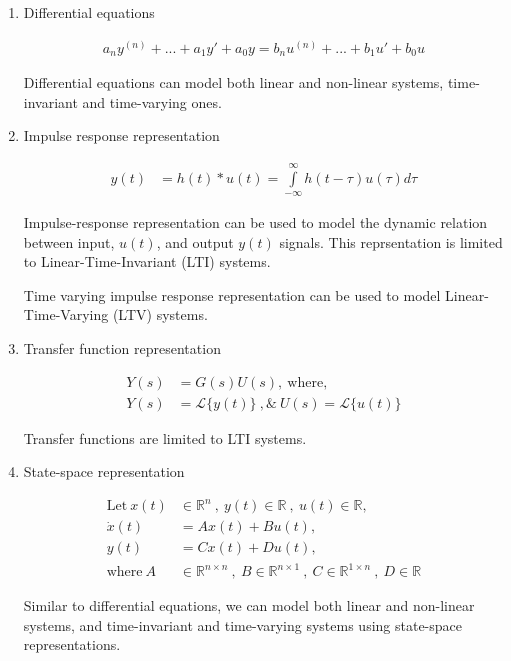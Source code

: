 \documentclass[twoside]{article}
\begin{document}
\begin{enumerate}
  \item Differential equations

\begin{align*}
a_n  y^{(n)} + ... + a_1 y' + a_0 y = b_{n}  u^{(n)} + ... + b_1 u' + b_0 u 
\end{align*}

Differential equations can model both linear and non-linear systems,
time-invariant and time-varying ones. 

  \item Impulse response representation

\begin{align*}
  y(t) &= h(t) \ast u(t) = \int\limits_{-\infty}^{\infty} h(t-\tau) u(\tau) d\tau 
\end{align*}

Impulse-response representation can be used to model the dynamic
relation between input, $u(t)$, and output $y(t)$ signals. 
This reprsentation is limited to Linear-Time-Invariant (LTI) systems. 

\par

Time varying impulse response representation can be used to model 
Linear-Time-Varying (LTV) systems.

\item Transfer function representation 

\begin{align*}
  Y(s) &= G(s) U(s) , \ \mathrm{where}  , \\
  Y(s) &= \mathcal{L}\lbrace y(t) \rbrace \ , \& \   
  U(s) = \mathcal{L}\lbrace u(t) \rbrace
\end{align*}

Transfer functions are limited to LTI systems. 

\item State-space representation

\begin{align*}
  \mathrm{Let} \ x(t) &\in \mathbb{R}^n \ , \ y(t) \in \mathbb{R} \ ,\  u(t) \in
  \mathbb{R} , \\
  \dot{x}(t) &= A x(t) + B u(t) , \\
  y(t) &= C x(t) + D u(t) , \\
  \mathrm{where} \ A &\in \mathbb{R}^{n \times n} \ , \ 
    B \in \mathbb{R}^{n \times 1} \ ,\  C \in \mathbb{R}^{1 \times n} \ , \ D \in \mathbb{R}
\end{align*}

Similar to differential equations, we can model both linear and non-linear systems,
and time-invariant and time-varying systems using state-space representations.

\end{enumerate}
\end{document}
